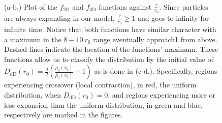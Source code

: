 \documentclass[aps,prl,twocolumn,showpacs,superscriptaddress,groupedaddress]{revtex4-1}  %
\begin{document}
{\begin{figure}
  \centering
  \\
\caption{\label{fig:classifying D} (a-b.) Plot of the $f_\text{2D}$ and $f_\text{3D}$ functions against $\frac{r}{r_0}$.  
Since particles are always expanding in our model, $\frac{r}{r_0} \ge 1$ and goes to infinity for infinite time.  Notice that
both functions have similar character with a maximum in the $8-10 ~ r_0$ range eventually approach1 from above.  Dashed lines
indicate the location of the functions' maximum.  These functions allow
us to classify the distribution by the initial value of $D_\text{dD}(r_0) = \frac{d}{2} \left(\frac{\rho_0(r_0)}{\bar{\rho}_0(r_0)} - 1\right)$
as is done in (c-d.).  Specifically, regions experiencing crossover (local contraction), in red, the uniform distribution, when 
$D_\text{dD}(r_0) = 0$, and regions experiencing more or less expansion than the uniform distribution, in green and blue, respectively
are marked in the figures.}
\end{figure} 

}
\end{document}
